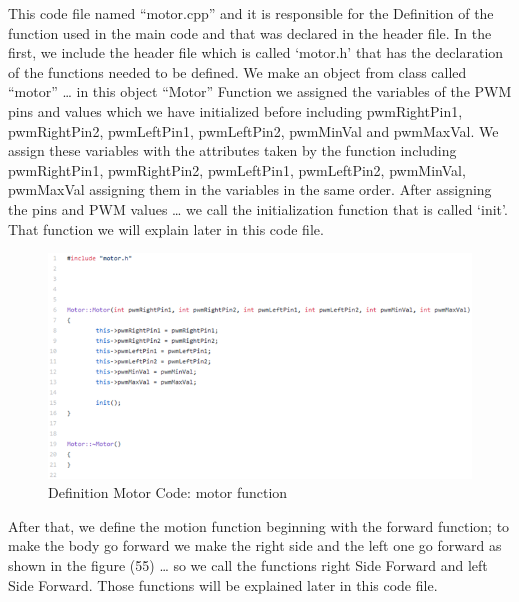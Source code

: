 \documentclass{article}
\begin{document}
This code file named “motor.cpp” and it is responsible for the Definition of the function used in the main code and that was declared in the header file. In the first, we include the header file which is called ‘motor.h’ that has the declaration of the functions needed to be defined. We make an object from class called “motor” … in this object “Motor” Function we assigned the variables of the PWM pins and values which we have initialized before including pwmRightPin1, pwmRightPin2, pwmLeftPin1, pwmLeftPin2, pwmMinVal and pwmMaxVal. We assign these variables with the attributes taken by the function including pwmRightPin1, pwmRightPin2, pwmLeftPin1, pwmLeftPin2, pwmMinVal, pwmMaxVal assigning them in the variables in the same order. After assigning the pins and PWM values … we call the initialization function that is called ‘init’. That function we will explain later in this code file.

\begin{figure}[h]
    \centering
    \includegraphics{figures/53.png}
    \caption{Definition Motor Code: motor function}
    \label{fig:my_label}
\end{figure}

\newpage

After that, we define the motion function beginning with the forward function; to make the body go forward we make the right side and the left one go forward as shown in the figure (55) … so we call the functions right Side Forward and left Side Forward. Those functions will be explained later in this code file.
\end{document}
